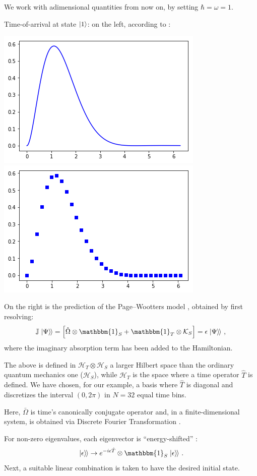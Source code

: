 \documentclass[landscape]{a0poster}
\newcommand{\idop}{\mathbbm{1}}           %
\newcommand{\hilb}[1]{\mathcal{#1}}       %
\newcommand{\ox}{\otimes}
\newcommand{\smallback}{\hspace{-0.115em}}
\newcommand{\dket}[1]{\left.\left| #1 \right\rangle\smallback\right\rangle}
\newcommand{\pwspace}{\hilb{H}_T \ox \hilb{H}_S}
\begin{document}
\begin{multicols}{3}
We work with adimensional quantities from now on,
by setting $\hbar = \omega = 1$.

Time-of-arrival at state $\ket{1}$: on the left, according to \parencite{RuschhauptAbsorption}:
\begin{center}\vspace{1cm}
  \includegraphics[width=0.4\linewidth]{2ldetect/toa-cont.png}
  \includegraphics[width=0.4\linewidth]{2ldetect/toa-pw.png}
\end{center}\vspace{1cm}

On the right is the prediction of the Page--Wootters model \parencite{Lloyd:Time},
obtained by first resolving:
\begin{equation}
  \mathbb{J} \dket{\Psi} = \left[ \hat{\Omega}\ox\idop_S + \idop_T\ox\mathcal{K}_S \right] = \epsilon\dket{\Psi} \,\text{,}
\end{equation}
where the imaginary absorption term has been added to the Hamiltonian.

The above is defined in $\pwspace$ a larger Hilbert space than
the ordinary quantum mechanics one ($\hilb{H}_S$), while $\hilb{H}_T$
is the space where
a time operator $\hat{T}$ is defined. We have chosen, for our example,
a basis where $\hat{T}$
is diagonal and discretizes the interval $(0, 2\pi)$ in $N=32$
equal time bins.

Here, $\bar\Omega$ is time's canonically conjugate operator and,
in a finite-dimensional system, is obtained via Discrete Fourier Transformation
\parencite{FiniteHilb}.

For non-zero eigenvalues, each eigenvector
is ``energy-shifted'' \parencite[``The zero eigenvalue'']{Lloyd:Time}:
\begin{equation}\label{eq:energyfix}
  \dket{\epsilon} \rightarrow e^{-i\epsilon\hat{T}} \ox \idop_S \dket{\epsilon}
  \,\text{.}
\end{equation}
Next, a suitable linear combination is taken to have the desired initial state.


\end{multicols}
\end{document}
